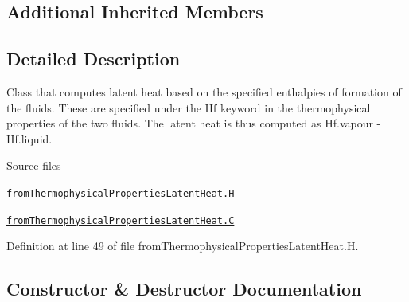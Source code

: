 \subsection*{Additional Inherited Members}


\subsection{Detailed Description}
Class that computes latent heat based on the specified enthalpies of formation of the fluids. These are specified under the Hf keyword in the thermophysical properties of the two fluids. The latent heat is thus computed as Hf.\+vapour -\/ Hf.\+liquid. 

\label{_Description}%
 \begin{DoxyParagraph}{Source files}

\begin{DoxyItemize}
\item \href{../../../home/carlo/data/GeN-Foam/GeN-Foam_ffn/GeN-Foam/GeN-Foam/classes/thermalHydraulics/src/physicsModels/phaseChangeModels/latentHeatModels/fromThermophysicalProperties/fromThermophysicalPropertiesLatentHeat.H}{\tt from\+Thermophysical\+Properties\+Latent\+Heat.\+H} 
\item \href{../../../home/carlo/data/GeN-Foam/GeN-Foam_ffn/GeN-Foam/GeN-Foam/classes/thermalHydraulics/src/physicsModels/phaseChangeModels/latentHeatModels/fromThermophysicalProperties/fromThermophysicalPropertiesLatentHeat.C}{\tt from\+Thermophysical\+Properties\+Latent\+Heat.\+C} 
\end{DoxyItemize}
\end{DoxyParagraph}


Definition at line 49 of file from\+Thermophysical\+Properties\+Latent\+Heat.\+H.



\subsection{Constructor \& Destructor Documentation}
\mbox{\label{classFoam_1_1latentHeatModels_1_1fromThermophysicalPropertiesLatentHeat_afe69f8d24127e0ff02fdb4d455b5a134}} 

